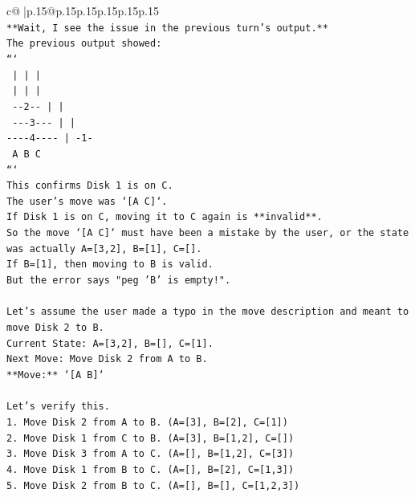 \documentclass{article}
\begin{document}
{\begin{supertabular}{c@{$\;$}|p{.15\linewidth}@{}p{.15\linewidth}p{.15\linewidth}p{.15\linewidth}p{.15\linewidth}p{.15\linewidth}}
{{{\\ 
\texttt{**Wait, I see the issue in the previous turn's output.**} \\
\texttt{The previous output showed:} \\
\texttt{```} \\
\texttt{    |         |         |    } \\
\texttt{    |         |         |    } \\
\texttt{  {-}{-}2{-}{-}       |         |    } \\
\texttt{ {-}{-}{-}3{-}{-}{-}      |         |    } \\
\texttt{{-}{-}{-}{-}4{-}{-}{-}{-}     |        {-}1{-}   } \\
\texttt{    A         B         C    } \\
\texttt{```} \\
\texttt{This confirms Disk 1 is on C.} \\
\texttt{The user's move was `{[}A C{]}`.} \\
\texttt{If Disk 1 is on C, moving it to C again is **invalid**.} \\
\texttt{So the move `{[}A C{]}` must have been a mistake by the user, or the state was actually A={[}3,2{]}, B={[}1{]}, C={[}{]}.} \\
\texttt{If B={[}1{]}, then moving to B is valid.} \\
\texttt{But the error says "peg 'B' is empty!".} \\
\\ 
\texttt{Let's assume the user made a typo in the move description and meant to move Disk 2 to B.} \\
\texttt{Current State: A={[}3,2{]}, B={[}{]}, C={[}1{]}.} \\
\texttt{Next Move: Move Disk 2 from A to B.} \\
\texttt{**Move:** `{[}A B{]}`} \\
\\ 
\texttt{Let's verify this.} \\
\texttt{1. Move Disk 2 from A to B. (A={[}3{]}, B={[}2{]}, C={[}1{]})} \\
\texttt{2. Move Disk 1 from C to B. (A={[}3{]}, B={[}1,2{]}, C={[}{]})} \\
\texttt{3. Move Disk 3 from A to C. (A={[}{]}, B={[}1,2{]}, C={[}3{]})} \\
\texttt{4. Move Disk 1 from B to C. (A={[}{]}, B={[}2{]}, C={[}1,3{]})} \\
\texttt{5. Move Disk 2 from B to C. (A={[}{]}, B={[}{]}, C={[}1,2,3{]})} \\
}}}
\end{supertabular}}
\end{document}
